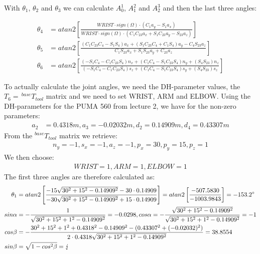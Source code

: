 With $\theta_1$, $\theta_2$ and $\theta_3$ we can calculate $A_0^1$, $A_1^2$ and $A_2^3$ and then the last three angles:

\begin{align*}
\theta_4 &=atan2\left[\frac{WRIST\cdot sign(\Omega)\cdot(C_1a_y-S_1a_x)}{WRIST\cdot sign(\Omega)\cdot(C_1C_{23}a_x+S_1C_{23}a_y-S_{23}a_z)}\right]\\
\theta_5 &=atan2\left[\frac{(C_1C_{23}C_4-S_1S_4)a_x+(S_1C_{23}C_4+C_1S_4)a_y-C_4S_{23}a_z}{C_1S_{23}a_x+S_1S_{23}a_y+C_{23}a_z}\right]\\
\theta_6 &=atan2\left[\frac{(-S_1C_4-C_1C_{23}S_4)n_x+(C_1C_4-S_1C_{23}S_4)n_y+(S_4S_{23})n_z}{(-S_1C_4-C_1C_{23}S_4)s_z+(C_1C_4-S_1C_{23}S_4)s_y+(S_4S_{23})s_z}\right]
\end{align*}

To actually calculate the joint angles, we need the DH-parameter values, the $T_6=\,^{base}T_{tool}$ matrix and we need to set WRIST, ARM and ELBOW.
Using the DH-parameters for the PUMA 560 from lecture 2, we have for the non-zero parameters:
\begin{align*}
a_2 &= 0.4318m, a_3=-0.02032m, d_2=0.14909m, d_4=0.43307m
\end{align*}
From the $^{base}T_{tool}$ matrix we retrieve:
\begin{align*}
n_y = -1, s_x = -1, a_z = -1, p_x = 30, p_y = 15, p_z = 1
\end{align*}
We then choose:
\begin{align*}
WRIST = 1, ARM = 1, ELBOW = 1
\end{align*}
The first three angles are therefore calculated as:
\begin{align*}
\theta_1 &=atan2\left[\frac{-15\sqrt{30^2+15^2-0.14909^2}-30\cdot 0.14909}{-30\sqrt{30^2+15^2-0.14909^2}+15\cdot 0.14909}\right] = atan2\left[\frac{-507.5830}{-1003.9843}\right] = -153.2\degree\\
sin\alpha &= -\frac{1}{\sqrt{30^2+15^2+1^2-0.14909^2}} =-0.0298, cos\alpha = -\frac{\sqrt{30^2+15^2-0.14909^2}}{\sqrt{30^2+15^2+1^2-0.14909^2}} = -1\\
cos\beta &= -\frac{30^2+15^2+1^2+0.4318^2-0.14909^2-(0.43307^2+(-0.02032)^2)}{2\cdot 0.4318\sqrt{30^2+15^2+1^2-0.14909^2}} = 38.8554\\
sin\beta &= \sqrt{1-cos^2\beta} = \lightning\\
\end{align*}